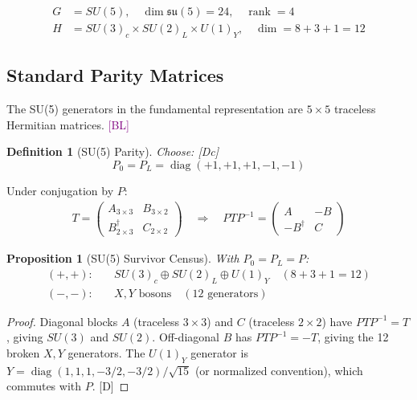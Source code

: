 \documentclass[11pt,a4paper]{article}
\newtheorem{proposition}[theorem]{Proposition}
\newtheorem{definition}[theorem]{Definition}
\newcommand{\tagD}{\textcolor{blue!70!black}{[D]}}
\newcommand{\tagDc}{\textcolor{blue!50!black}{[Dc]}}
\newcommand{\tagBL}{\textcolor{purple}{[BL]}}
\DeclareMathOperator{\diag}{diag}
\DeclareMathOperator{\rank}{rank}
\begin{document}
\begin{align}
\label{eq:su5-dim}
G &= SU(5), \quad \dim \mathfrak{su}(5) = 24, \quad \rank = 4 \\
\label{eq:su5-target}
H &= SU(3)_c \times SU(2)_L \times U(1)_Y, \quad \dim = 8 + 3 + 1 = 12
\end{align}

\subsection{Standard Parity Matrices}

The SU(5) generators in the fundamental representation are $5 \times 5$
traceless Hermitian matrices. \tagBL

\begin{definition}[SU(5) Parity]
\label{def:su5-parity}
Choose: \tagDc
\begin{equation}
\label{eq:su5-P0}
P_0 = P_L = \diag(+1, +1, +1, -1, -1)
\end{equation}
\end{definition}

Under conjugation by $P$:
\begin{align}
\label{eq:su5-block}
T = \begin{pmatrix} A_{3\times 3} & B_{3\times 2} \\ B^\dagger_{2\times 3} & C_{2\times 2} \end{pmatrix}
\quad \Rightarrow \quad
P T P^{-1} = \begin{pmatrix} A & -B \\ -B^\dagger & C \end{pmatrix}
\end{align}

\begin{proposition}[SU(5) Survivor Census]
\label{prop:su5-census}
With $P_0 = P_L = P$:
\begin{align}
\label{eq:su5-survivors}
(+,+): \quad & SU(3)_c \oplus SU(2)_L \oplus U(1)_Y \quad (8 + 3 + 1 = 12) \\
\label{eq:su5-broken}
(-,-): \quad & X, Y \text{ bosons} \quad (12 \text{ generators})
\end{align}
\end{proposition}

\begin{proof}
Diagonal blocks $A$ (traceless $3\times 3$) and $C$ (traceless $2\times 2$)
have $P T P^{-1} = T$, giving $SU(3)$ and $SU(2)$.
Off-diagonal $B$ has $P T P^{-1} = -T$, giving the 12 broken $X, Y$ generators.
The $U(1)_Y$ generator is $Y = \diag(1,1,1,-3/2,-3/2)/\sqrt{15}$
(or normalized convention), which commutes with $P$. \tagD
\end{proof}
\end{document}
